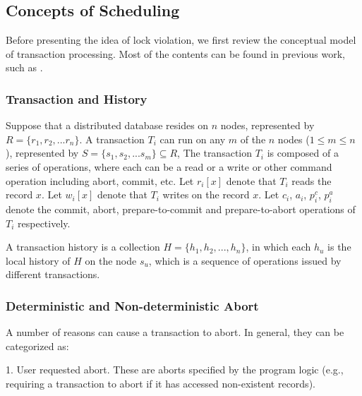 \documentclass[conference]{IEEEtran}
\begin{document}
\subsection{Concepts of Scheduling}
Before presenting the idea of lock violation, we first review the conceptual model of transaction processing. Most of the contents can be found in previous work, such as \cite{LockNoWait:journals/csur/BernsteinG81}.

\subsubsection{Transaction and History}
Suppose that a distributed database resides on ${n}$ nodes, represented by ${R = \{r_1, r_2, ... r_n\}}$.
A transaction ${T_i}$ can run on any ${m}$ of the ${n}$ nodes ($1 \le m \le n$), represented by  ${S = \{s_1, s_2, ... s_m\} \subseteq R}$,
The transaction ${T_i}$ is composed of a series of operations, %
where each can be a read or a write or other command operation including abort, commit, etc.
Let ${r_i[x]}$ denote that ${T_i}$ reads the record ${x}$. Let ${w_i[x]}$ denote that ${T_i}$ writes on the record ${x}$.
Let ${c_i}$, ${a_i}$, ${p^c_i}$, ${p^a_i}$ denote the commit, abort, prepare-to-commit and prepare-to-abort operations of ${T_i}$ respectively.


A transaction history is a collection ${H = \{h_1, h_2, ..., h_n\}}$, in which
each ${h_u}$ is the local history of $H$ on the node ${s_u}$, which is a sequence of operations issued by different transactions.


\subsubsection{Deterministic and Non-deterministic Abort}
A number of reasons can cause a transaction to abort. In general, they can be categorized as:

1. User requested abort. These are aborts specified by the program logic (e.g., requiring a transaction to abort if it has accessed non-existent records).
\end{document}
